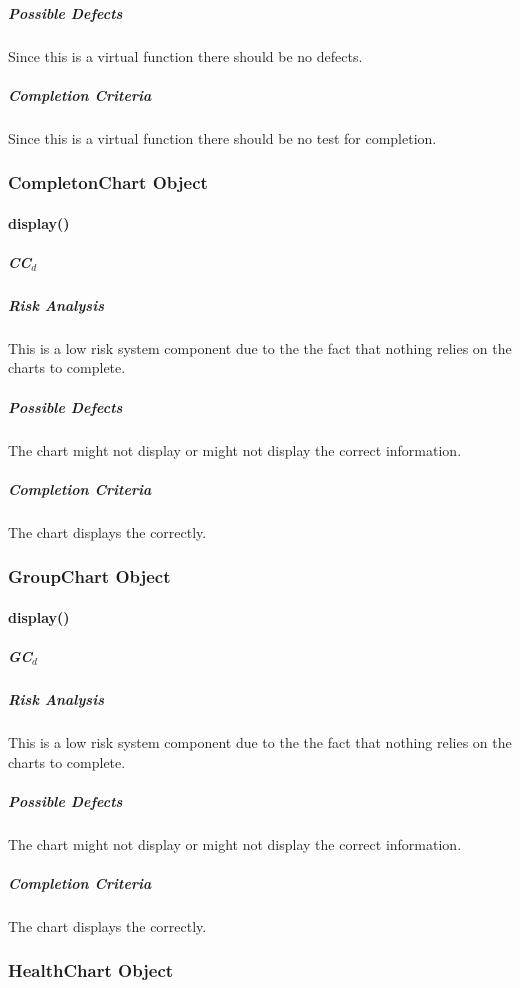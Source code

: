 \documentclass{article}
\begin{document}
\subparagraph{Possible Defects}
Since this is a virtual function there should be no defects.
\subparagraph{Completion Criteria}
Since this is a virtual function there should be no test for completion.





\subsubsection{CompletonChart Object}

\paragraph{display()}

\subparagraph{CC$_{d}$}

\subparagraph{Risk Analysis}
This is a low risk system component due to the the fact that nothing relies on the charts to complete.

\subparagraph{Possible Defects}
The chart might not display or might not display the correct information.

\subparagraph{Completion Criteria}
The chart displays the correctly.

\subsubsection{GroupChart Object}

\paragraph{display()}

\subparagraph{GC$_{d}$}

\subparagraph{Risk Analysis}
This is a low risk system component due to the the fact that nothing relies on the charts to complete.

\subparagraph{Possible Defects}
The chart might not display or might not display the correct information.

\subparagraph{Completion Criteria}
The chart displays the correctly.





\subsubsection{HealthChart Object}
\end{document}
